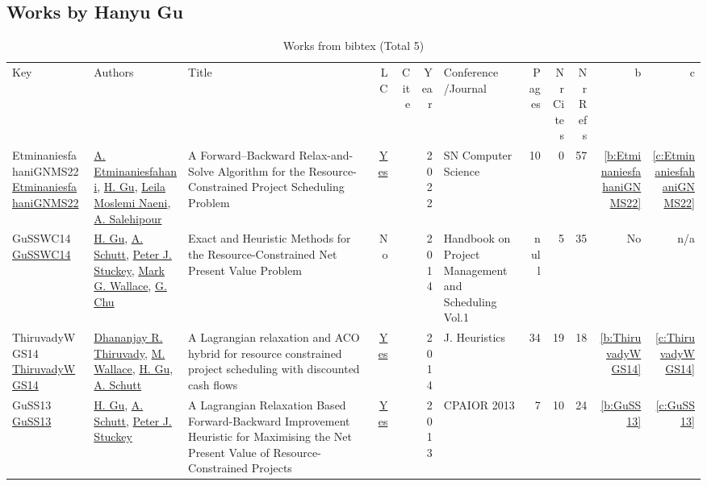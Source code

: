 \subsection{Works by Hanyu Gu}
\label{sec:a342}
{\scriptsize
\begin{longtable}{>{\raggedright\arraybackslash}p{3cm}>{\raggedright\arraybackslash}p{6cm}>{\raggedright\arraybackslash}p{6.5cm}rrrp{2.5cm}rrrrr}
\rowcolor{white}\caption{Works from bibtex (Total 5)}\\ \toprule
\rowcolor{white}Key & Authors & Title & LC & Cite & Year & \shortstack{Conference\\/Journal} & Pages & \shortstack{Nr\\Cites} & \shortstack{Nr\\Refs} & b & c \\ \midrule\endhead
\bottomrule
\endfoot
EtminaniesfahaniGNMS22 \href{http://dx.doi.org/10.1007/s42979-022-01487-1}{EtminaniesfahaniGNMS22} & \hyperref[auth:a919]{A. Etminaniesfahani}, \hyperref[auth:a342]{H. Gu}, \hyperref[auth:a920]{Leila Moslemi Naeni}, \hyperref[auth:a921]{A. Salehipour} & A Forward–Backward Relax-and-Solve Algorithm for the Resource-Constrained Project Scheduling Problem & \href{works/EtminaniesfahaniGNMS22.pdf}{Yes} & \cite{EtminaniesfahaniGNMS22} & 2022 & SN Computer Science & 10 & 0 & 57 & \ref{b:EtminaniesfahaniGNMS22} & \ref{c:EtminaniesfahaniGNMS22}\\
GuSSWC14 \href{http://dx.doi.org/10.1007/978-3-319-05443-8_14}{GuSSWC14} & \hyperref[auth:a342]{H. Gu}, \hyperref[auth:a125]{A. Schutt}, \hyperref[auth:a126]{Peter J. Stuckey}, \hyperref[auth:a156]{Mark G. Wallace}, \hyperref[auth:a349]{G. Chu} & Exact and Heuristic Methods for the Resource-Constrained Net Present Value Problem & No & \cite{GuSSWC14} & 2014 & Handbook on Project Management and Scheduling Vol.1 & null & 5 & 35 & No & n/a\\
ThiruvadyWGS14 \href{https://doi.org/10.1007/s10732-014-9260-3}{ThiruvadyWGS14} & \hyperref[auth:a402]{Dhananjay R. Thiruvady}, \hyperref[auth:a117]{M. Wallace}, \hyperref[auth:a342]{H. Gu}, \hyperref[auth:a125]{A. Schutt} & A Lagrangian relaxation and {ACO} hybrid for resource constrained project scheduling with discounted cash flows & \href{works/ThiruvadyWGS14.pdf}{Yes} & \cite{ThiruvadyWGS14} & 2014 & J. Heuristics & 34 & 19 & 18 & \ref{b:ThiruvadyWGS14} & \ref{c:ThiruvadyWGS14}\\
GuSS13 \href{https://doi.org/10.1007/978-3-642-38171-3\_24}{GuSS13} & \hyperref[auth:a342]{H. Gu}, \hyperref[auth:a125]{A. Schutt}, \hyperref[auth:a126]{Peter J. Stuckey} & A Lagrangian Relaxation Based Forward-Backward Improvement Heuristic for Maximising the Net Present Value of Resource-Constrained Projects & \href{works/GuSS13.pdf}{Yes} & \cite{GuSS13} & 2013 & CPAIOR 2013 & 7 & 10 & 24 & \ref{b:GuSS13} & \ref{c:GuSS13}\\

\end{longtable}}
